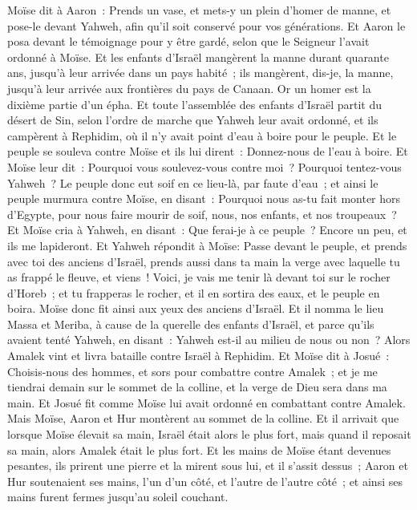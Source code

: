 \begin{multicols}{2}
Moïse dit à Aaron~: Prends un vase, et mets-y un plein d'homer de manne, et pose-le devant Yahweh, afin qu'il soit conservé pour vos générations.
Et Aaron le posa devant le témoignage pour y être gardé, selon que le Seigneur l'avait ordonné à Moïse.
Et les enfants d'Israël mangèrent la manne durant quarante ans, jusqu'à leur arrivée dans un pays habité~; ils mangèrent, dis-je, la manne, jusqu'à leur arrivée aux frontières du pays de Canaan.
Or un homer est la dixième partie d'un épha.
\VerseOne{}Et toute l'assemblée des enfants d'Israël partit du désert de Sin, selon l'ordre de marche que Yahweh leur avait ordonné, et ils campèrent à Rephidim, où il n'y avait point d'eau à boire pour le peuple.
Et le peuple se souleva contre Moïse et ils lui dirent~: Donnez-nous de l'eau à boire. Et Moïse leur dit~: Pourquoi vous soulevez-vous contre moi~? Pourquoi tentez-vous Yahweh~?
Le peuple donc eut soif en ce lieu-là, par faute d'eau~; et ainsi le peuple murmura contre Moïse, en disant~: Pourquoi nous as-tu fait monter hors d'Egypte, pour nous faire mourir de soif, nous, nos enfants, et nos troupeaux~?
Et Moïse cria à Yahweh, en disant~: Que ferai-je à ce peuple~? Encore un peu, et ils me lapideront.
Et Yahweh répondit à Moïse: Passe devant le peuple, et prends avec toi des anciens d'Israël, prends aussi dans ta main la verge avec laquelle tu as frappé le fleuve, et viens~!
Voici, je vais me tenir là devant toi sur le rocher d'Horeb~; et tu frapperas le rocher, et il en sortira des eaux, et le peuple en boira. Moïse donc fit ainsi aux yeux des anciens d'Israël.
Et il nomma le lieu Massa et Meriba, à cause de la querelle des enfants d'Israël, et parce qu'ils avaient tenté Yahweh, en disant~: Yahweh est-il au milieu de nous ou non~?
Alors Amalek vint et livra bataille contre Israël à Rephidim.
Et Moïse dit à Josué~: Choisis-nous des hommes, et sors pour combattre contre Amalek~; et je me tiendrai demain sur le sommet de la colline, et la verge de Dieu sera dans ma main.
Et Josué fit comme Moïse lui avait ordonné en combattant contre Amalek. Mais Moïse, Aaron et Hur montèrent au sommet de la colline.
Et il arrivait que lorsque Moïse élevait sa main, Israël était alors le plus fort, mais quand il reposait sa main, alors Amalek était le plus fort.
Et les mains de Moïse étant devenues pesantes, ils prirent une pierre et la mirent sous lui, et il s'assit dessus~; Aaron et Hur soutenaient ses mains, l'un d'un côté, et l'autre de l'autre côté~; et ainsi ses mains furent fermes jusqu'au soleil couchant.

\end{multicols}

